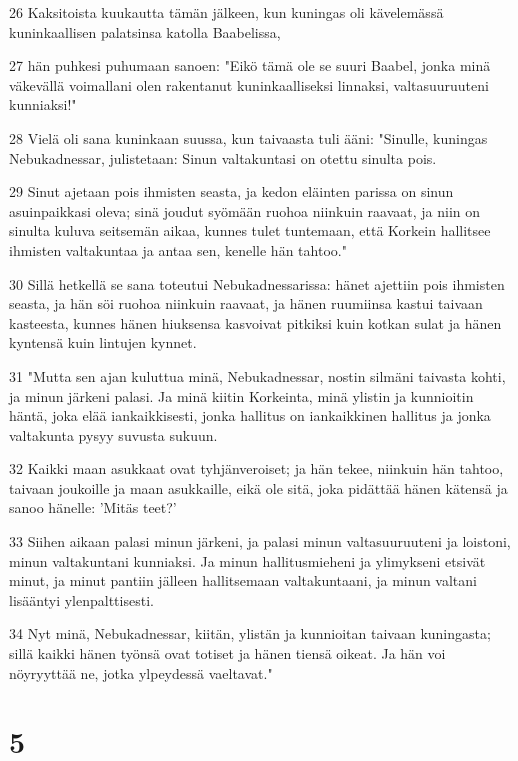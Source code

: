 \par 26 Kaksitoista kuukautta tämän jälkeen, kun kuningas oli kävelemässä kuninkaallisen palatsinsa katolla Baabelissa,
\par 27 hän puhkesi puhumaan sanoen: "Eikö tämä ole se suuri Baabel, jonka minä väkevällä voimallani olen rakentanut kuninkaalliseksi linnaksi, valtasuuruuteni kunniaksi!"
\par 28 Vielä oli sana kuninkaan suussa, kun taivaasta tuli ääni: "Sinulle, kuningas Nebukadnessar, julistetaan: Sinun valtakuntasi on otettu sinulta pois.
\par 29 Sinut ajetaan pois ihmisten seasta, ja kedon eläinten parissa on sinun asuinpaikkasi oleva; sinä joudut syömään ruohoa niinkuin raavaat, ja niin on sinulta kuluva seitsemän aikaa, kunnes tulet tuntemaan, että Korkein hallitsee ihmisten valtakuntaa ja antaa sen, kenelle hän tahtoo."
\par 30 Sillä hetkellä se sana toteutui Nebukadnessarissa: hänet ajettiin pois ihmisten seasta, ja hän söi ruohoa niinkuin raavaat, ja hänen ruumiinsa kastui taivaan kasteesta, kunnes hänen hiuksensa kasvoivat pitkiksi kuin kotkan sulat ja hänen kyntensä kuin lintujen kynnet.
\par 31 "Mutta sen ajan kuluttua minä, Nebukadnessar, nostin silmäni taivasta kohti, ja minun järkeni palasi. Ja minä kiitin Korkeinta, minä ylistin ja kunnioitin häntä, joka elää iankaikkisesti, jonka hallitus on iankaikkinen hallitus ja jonka valtakunta pysyy suvusta sukuun.
\par 32 Kaikki maan asukkaat ovat tyhjänveroiset; ja hän tekee, niinkuin hän tahtoo, taivaan joukoille ja maan asukkaille, eikä ole sitä, joka pidättää hänen kätensä ja sanoo hänelle: 'Mitäs teet?'
\par 33 Siihen aikaan palasi minun järkeni, ja palasi minun valtasuuruuteni ja loistoni, minun valtakuntani kunniaksi. Ja minun hallitusmieheni ja ylimykseni etsivät minut, ja minut pantiin jälleen hallitsemaan valtakuntaani, ja minun valtani lisääntyi ylenpalttisesti.
\par 34 Nyt minä, Nebukadnessar, kiitän, ylistän ja kunnioitan taivaan kuningasta; sillä kaikki hänen työnsä ovat totiset ja hänen tiensä oikeat. Ja hän voi nöyryyttää ne, jotka ylpeydessä vaeltavat."

\chapter{5}

